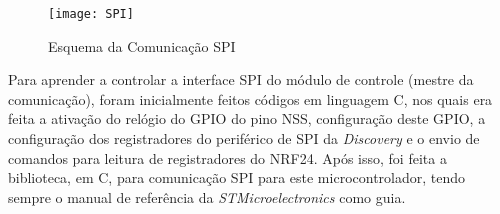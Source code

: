 \begin{figure}
	\centering
	\texttt{[image: SPI]}
	\caption{Esquema da Comunicação SPI}
	\label{fig:spi}
\end{figure}

Para aprender a controlar a interface SPI do módulo de controle (mestre da comunicação), foram inicialmente feitos códigos em linguagem C, nos quais era feita a ativação do relógio do GPIO do pino NSS, configuração deste GPIO, a configuração dos registradores do periférico de SPI da \textit{Discovery} e o envio de comandos para leitura de registradores do NRF24.
Após isso, foi feita a biblioteca, em C, para comunicação SPI para este microcontrolador, tendo sempre o manual de referência da \textit{STMicroelectronics}\cite{stm32f4referencemanual} como guia.


